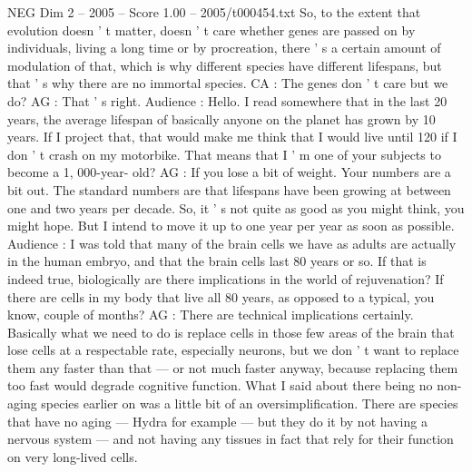 \begin{textsample}{NEG Dim 2 – 2005 – Score 1.00 – 2005/t000454.txt}
So, to the extent that evolution doesn ' t matter, doesn ' t care whether genes are passed on by individuals, living a long time or by procreation, there ' s a certain amount of modulation of that, which is why different species have different lifespans, but that ' s why there are no immortal species.
CA : The genes don ' t care but we do?
AG : That ' s right.
Audience : Hello.
I read somewhere that in the last 20 years, the average lifespan of basically anyone on the planet has grown by 10 years.
If I project that, that would make me think that I would live until 120 if I don ' t crash on my motorbike.
That means that I ' m one of your subjects to become a 1, 000-year- old?
AG : If you lose a bit of weight.
Your numbers are a bit out.
The standard numbers are that lifespans have been growing at between one and two years per decade.
So, it ' s not quite as good as you might think, you might hope.
But I intend to move it up to one year per year as soon as possible.
Audience : I was told that many of the brain cells we have as adults are actually in the human embryo, and that the brain cells last 80 years or so.
If that is indeed true, biologically are there implications in the world of rejuvenation?
If there are cells in my body that live all 80 years, as opposed to a typical, you know, couple of months?
AG : There are technical implications certainly.
Basically what we need to do is replace cells in those few areas of the brain that lose cells at a respectable rate, especially neurons, but we don ' t want to replace them any faster than that — or not much faster anyway, because replacing them too fast would degrade cognitive function.
What I said about there being no non-aging species earlier on was a little bit of an oversimplification.
There are species that have no aging — Hydra for example — but they do it by not having a nervous system — and not having any tissues in fact that rely for their function on very long-lived cells.

\end{textsample}
